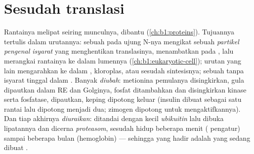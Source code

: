 \section{Sesudah translasi}

\begin{proposition}\label{prop:b1:gene-expression:after}
Rantainya melipat seiring munculnya, dibantu 
(\cref{ch:b1:proteins}). Tujuannya tertulis dalam urutannya: sebuah
\emph{} pada ujung N-nya mengikat sebuah \emph{partikel
pengenal isyarat} yang menghentikan translasinya, menambatkan
 pada , lalu merangkai rantainya ke dalam
lumennya (\cref{ch:b1:eukaryotic-cell}); urutan yang lain mengarahkan
 ke dalam , kloroplas,  atau 
sesudah sintesisnya; sebuah  tanpa isyarat tinggal dalam
. Banyak  \emph{diubah}: metionina pemulanya
disingkirkan, gula dipautkan dalam RE dan Golginya, fosfat ditambahkan
dan disingkirkan kinase serta fosfatase,  dipautkan, keping
dipotong keluar (insulin dibuat sebagai satu rantai lalu dipotong
menjadi dua; zimogen dipotong untuk mengaktifkannya). Dan tiap 
akhirnya \emph{diuraikan}: ditandai dengan  kecil
\emph{ubikuitin} lalu dibuka lipatannya dan dicerna \emph{proteasom},
sesudah hidup beberapa menit ( pengatur) sampai beberapa bulan
(hemoglobin) --- sehingga  yang hadir adalah  yang sedang
dibuat .
\end{proposition}

